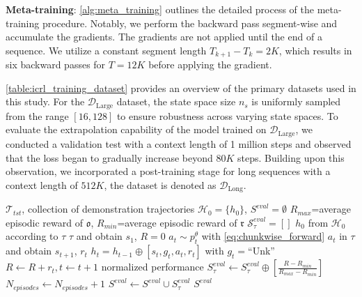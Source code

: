 \documentclass{article}
\begin{document}
\textbf{Meta-training}: \cref{alg:meta_training} outlines the detailed process of the meta-training procedure. Notably, we perform the backward pass segment-wise and accumulate the gradients. The gradients are not applied until the end of a sequence. We utilize a constant segment length $ T_{k+1} - T_k = 2K $, which results in six backward passes for $ T = 12K $ before applying the gradient. 

\cref{table:icrl_training_dataset} provides an overview of the primary datasets used in this study. For the $\mathcal{D}_{\text{Large}}$ dataset, the state space size $ n_s $ is uniformly sampled from the range $[16, 128]$ to ensure robustness across varying state spaces. To evaluate the extrapolation capability of the model trained on $\mathcal{D}_{\text{Large}}$, we conducted a validation test with a context length of 1 million steps and observed that the loss began to gradually increase beyond $80K$ steps. Building upon this observation, we incorporated a post-training stage for long sequences with a context length of $512K$, the dataset is denoted as $\mathcal{D}_{\text{Long}}$.

\begin{algorithm}[htbp]
   \caption{Evaluation Process}
   \label{alg:evaluation_process}
    \begin{algorithmic}
        $\mathcal{T}_{tst}$, collection of demonstration trajectories $\mathcal{H}_0=\{h_0\}$, 
        $S^{eval}=\emptyset$
             $R_{max}$=average episodic reward of $\mathfrak{o}$, $R_{min}$=average episodic reward of $\mathfrak{r}$
              $\mathcal{S}^{eval}_{\tau}=[]$
            \REPEAT
                 $h_0$ from $\mathcal{H}_0$ according to $\tau$
                 $\tau$ and obtain $s_1$, $R=0$
                \REPEAT
                     $a_t \sim p^{\theta}_t$ with \cref{eq:chunkwise_forward}
                     $a_t$ in $\tau$ and obtain $s_{t+1}$, $r_t$
                     $h_{t}=h_{t-1} \oplus [s_t, g_t,a_t,r_t] $ with $g_t=$``Unk''
                     $R \leftarrow R+r_t, t \leftarrow t+1$
                 normalized performance $S^{eval}_{\tau} \leftarrow S^{eval}_{\tau} \oplus [\frac{R - R_{min}}{R_{max} - R_{min}}]$
                 $N_{episodes} \leftarrow N_{episodes} + 1$
             $S^{eval} \leftarrow S^{eval} \cup S^{eval}_{\tau}$
       \ENDFOR
         $S^{eval}$
    \end{algorithmic}
\end{algorithm}
\end{document}
